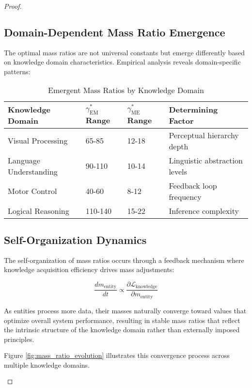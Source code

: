 \begin{proof}
\subsection{Domain-Dependent Mass Ratio Emergence}

The optimal mass ratios are not universal constants but emerge differently based on knowledge domain characteristics. Empirical analysis reveals domain-specific patterns:

\begin{table}[h]
\centering
\caption{Emergent Mass Ratios by Knowledge Domain}
\label{tab:emergent_mass_ratios}
\begin{tabular}{p{3cm} p{3cm} p{3cm} p{4cm}}
\textbf{Knowledge Domain} & \textbf{$\gamma_{\text{EM}}^*$ Range} & \textbf{$\gamma_{\text{ME}}^*$ Range} & \textbf{Determining Factor} \\
\hline
Visual Processing & 65-85 & 12-18 & Perceptual hierarchy depth \\
Language Understanding & 90-110 & 10-14 & Linguistic abstraction levels \\
Motor Control & 40-60 & 8-12 & Feedback loop frequency \\
Logical Reasoning & 110-140 & 15-22 & Inference complexity \\
\hline
\end{tabular}
\end{table}

\subsection{Self-Organization Dynamics}

The self-organization of mass ratios occurs through a feedback mechanism where knowledge acquisition efficiency drives mass adjustments:

\begin{equation}
\frac{dm_{\text{entity}}}{dt} \propto \frac{\partial \mathcal{L}_{\text{knowledge}}}{\partial m_{\text{entity}}}
\end{equation}

As entities process more data, their masses naturally converge toward values that optimize overall system performance, resulting in stable mass ratios that reflect the intrinsic structure of the knowledge domain rather than externally imposed principles.

Figure \ref{fig:mass_ratio_evolution} illustrates this convergence process across multiple knowledge domains.

\begin{figure}[h]
\centering
{}
\end{figure}
\end{proof}

